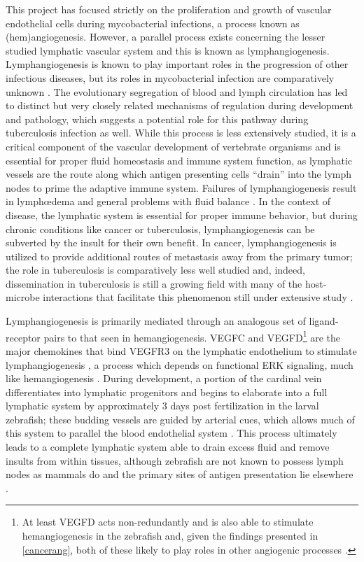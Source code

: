 This project has focused strictly on the proliferation and growth of vascular endothelial cells during mycobacterial infections, a process known as (hem)angiogenesis. However, a parallel process exists concerning the lesser studied lymphatic vascular system and this is known as lymphangiogenesis. Lymphangiogenesis is known to play important roles in the progression of other infectious diseases, but its roles in mycobacterial infection are comparatively unknown \citep{Bowlin2021}. The evolutionary segregation of blood and lymph circulation has led to distinct but very closely related mechanisms of regulation during development and pathology, which suggests a potential role for this pathway during tuberculosis infection as well. While this process is less extensively studied, it is a critical component of the vascular development of vertebrate organisms and is essential for proper fluid homeostasis and immune system function, as lymphatic vessels are the route along which antigen presenting cells ``drain'' into the lymph nodes to prime the adaptive immune system. Failures of lymphangiogenesis result in lymph\oe dema and general problems with fluid balance \citep{Makinen2001}. In the context of disease, the lymphatic system is essential for proper immune behavior, but during chronic conditions like cancer or tuberculosis, lymphangiogenesis can be subverted by the insult for their own benefit. In cancer, lymphangiogenesis is utilized to provide additional routes of metastasis away from the primary tumor; the role in tuberculosis is comparatively less well studied \citep{Augustin2009, Huang2010, Duong2012, Stacker2014} and, indeed, dissemination in tuberculosis is still a growing field with many of the host\hyp{}microbe interactions that facilitate this phenomenon still under extensive study \citep{Saelens2022}.

Lymphangiogenesis is primarily mediated through an analogous set of ligand\hyp{}receptor pairs to that seen in hemangiogenesis. VEGFC and VEGFD\footnote{At least VEGFD acts non\hyp{}redundantly and is also able to stimulate hemangiogenesis in the zebrafish and, given the findings presented in \autoref{cancerang}, both of these likely to play roles in other angiogenic processes \citep{Bower2017a}.} are the major  chemokines that bind VEGFR3 on the lymphatic endothelium to stimulate lymphangiogenesis \citep{Alitalo2005, Kuchler2006, Haiko2008}, a process which depends on functional ERK signaling, much like hemangiogenesis \citep{Shin2016, Shin2017}. During development, a portion of the cardinal vein differentiates into lymphatic progenitors \citep{Yaniv2006, Nicenboim2015} and begins to elaborate into a full lymphatic system by approximately 3 days post fertilization in the larval zebrafish; these budding vessels are guided by arterial cues, which allows much of this system to parallel the blood endothelial system \citep{Bussmann2010, Jung2017}. This process ultimately leads to a complete lymphatic system able to drain excess fluid and remove insults from within tissues, although zebrafish are not known to possess lymph nodes as mammals do and the primary sites of antigen presentation lie elsewhere \citep{Korbut2016, vanLessen2017, Onder2017}.

